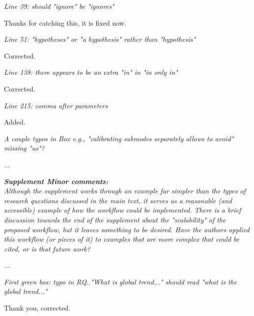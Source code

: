 \documentclass[11pt,letter]{article}
\begin{document}
\begin{mybox}
\emph{Line 39: should "ignore" be "ignores"}
\end{mybox}

Thanks for catching this, it is fixed now. 

\begin{mybox}
\emph{Line 51: "hypotheses" or "a hypothesis" rather than "hypothesis"}
\end{mybox}

Corrected.

\begin{mybox}
\emph{Line 138: there appears to be an extra "in" in "in only in"}
\end{mybox}

Corrected.


\begin{mybox}
\emph{Line 215: comma after parameters}
\end{mybox}

Added.

\begin{mybox}
\emph{A couple typos in Box e.g., "calibrating submodes separately allows to
avoid" missing "us"?}
\end{mybox}


...

\begin{mybox}
\emph{\textbf{Supplement Minor comments:}\\
Although the supplement works through an example far simpler than the
types of research questions discussed in the main text, it serves as a
reasonable (and accessible) example of how the workflow could be
implemented. There is a brief discussion towards the end of the
supplement about the "scalability" of the proposed workflow, but it
leaves something to be desired. Have the authors applied this workflow
(or pieces of it) to examples that are more complex that could be cited,
or is that future work?}
\end{mybox}

... 

\begin{mybox}
\emph{First green box: typo in RQ.."What is global trend..." should read
"what is the global trend..."}
\end{mybox}

Thank you, corrected.
\end{document}
